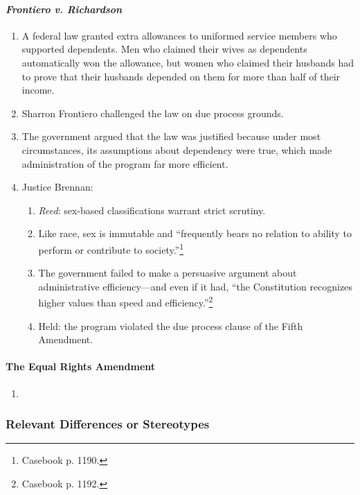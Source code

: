 \paragraph{\emph{Frontiero v. Richardson}}
\begin{enumerate}
    \item A federal law granted extra allowances to uniformed service members 
    who supported dependents. Men who claimed their wives as dependents 
    automatically won the allowance, but women who claimed their husbands 
    had to prove that their husbands depended on them for more than half of 
    their income.
    \item Sharron Frontiero challenged the law on due process grounds.
    \item The government argued that the law was justified because under most 
    circumstances, its assumptions about dependency were true, which made 
    administration of the program far more efficient.
    \item Justice Brennan:
    \begin{enumerate}
        \item \emph{Reed}: sex-based classifications warrant strict scrutiny.
        \item Like race, sex is immutable and ``frequently bears no relation 
        to ability to perform or contribute to society.''\footnote{Casebook p. 
        1190.}
        \item The government failed to make a persuasive argument about 
        administrative efficiency---and even if it had, ``the Constitution 
        recognizes higher values than speed and 
        efficiency.''\footnote{Casebook p. 1192.}
        \item Held: the program violated the due process clause of the Fifth 
        Amendment.
    \end{enumerate}
\end{enumerate}

\paragraph{The Equal Rights Amendment}

\begin{enumerate}
    \item %
\end{enumerate}
 
\subsubsection{Relevant Differences or Stereotypes}

